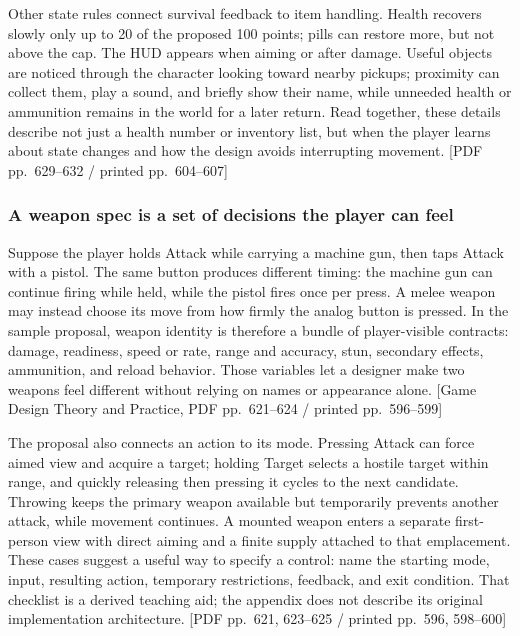 Other state rules connect survival feedback to item handling. Health recovers slowly only up to 20 of the proposed 100 points; pills can restore more, but not above the cap. The HUD appears when aiming or after damage. Useful objects are noticed through the character looking toward nearby pickups; proximity can collect them, play a sound, and briefly show their name, while unneeded health or ammunition remains in the world for a later return. Read together, these details describe not just a health number or inventory list, but when the player learns about state changes and how the design avoids interrupting movement. {[}PDF pp.~629--632 / printed pp.~604--607{]}

\subsubsection{A weapon spec is a set of decisions the player can feel}\label{05-engine-i-ch009-a-weapon-spec-is-a-set-of-decisions-the-player-can-feel}

Suppose the player holds Attack while carrying a machine gun, then taps Attack with a pistol. The same button produces different timing: the machine gun can continue firing while held, while the pistol fires once per press. A melee weapon may instead choose its move from how firmly the analog button is pressed. In the sample proposal, weapon identity is therefore a bundle of player-visible contracts: damage, readiness, speed or rate, range and accuracy, stun, secondary effects, ammunition, and reload behavior. Those variables let a designer make two weapons feel different without relying on names or appearance alone. {[}Game Design Theory and Practice, PDF pp.~621--624 / printed pp.~596--599{]}

The proposal also connects an action to its mode. Pressing Attack can force aimed view and acquire a target; holding Target selects a hostile target within range, and quickly releasing then pressing it cycles to the next candidate. Throwing keeps the primary weapon available but temporarily prevents another attack, while movement continues. A mounted weapon enters a separate first-person view with direct aiming and a finite supply attached to that emplacement. These cases suggest a useful way to specify a control: name the starting mode, input, resulting action, temporary restrictions, feedback, and exit condition. That checklist is a derived teaching aid; the appendix does not describe its original implementation architecture. {[}PDF pp.~621, 623--625 / printed pp.~596, 598--600{]}

